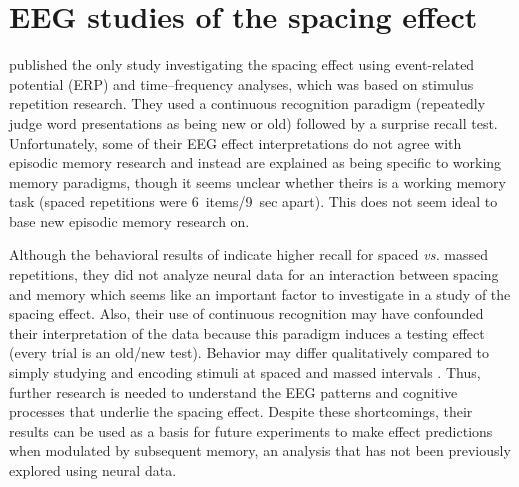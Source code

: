
\section{EEG studies of the spacing effect}

 published the only study investigating the spacing effect using event-related potential (ERP) and time--frequency analyses, which was based on stimulus repetition research.  They used a continuous recognition paradigm (repeatedly judge word presentations as being new or old) followed by a surprise recall test.
Unfortunately, some of their EEG effect interpretations do not agree with episodic memory research and instead are explained as being specific to working memory paradigms, \cbstart though it seems unclear whether theirs is a working memory task (spaced repetitions were 6~items/9~sec apart).  This does not seem ideal to base new episodic memory research on.
\cbend


Although the behavioral results of  indicate higher recall for spaced \textit{vs.} massed repetitions, they did not analyze neural data for an interaction between spacing and memory which seems like an important factor to investigate in a study of the spacing effect.  Also, their use of continuous recognition may have confounded their interpretation of the data because this paradigm induces a testing effect (every trial is an old/new test).  Behavior may differ qualitatively compared to simply studying and encoding stimuli at spaced and massed intervals \cite[p.~91]{DelaEtal2010}.
Thus, further research is needed to understand the EEG patterns and cognitive processes that underlie the spacing effect.  Despite these shortcomings, their results can be used as a basis for future experiments to make effect predictions when modulated by subsequent memory, an analysis that has not been previously explored using neural data.




